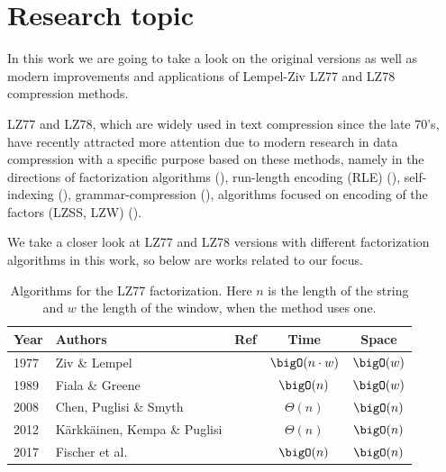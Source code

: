 \section{Research topic}
\label{seq:intro}

In this work we are going to take a look on the original versions as well as modern improvements and applications of Lempel-Ziv LZ77 and LZ78 compression methods.

LZ77 and LZ78, which are widely used in text compression since the late 70's, have recently attracted more attention due to modern research in data compression with a specific purpose based on these methods, namely in the directions of factorization algorithms (\cite{ziv1977, ziv1978,kkp2012,fischer2017,acm2012}), run-length encoding (RLE) (\cite{policriti2018}), self-indexing (\cite{kreft2011,gagie2014}), grammar-compression (\cite{rytter2003}), algorithms focused on encoding of the factors (LZSS, LZW) (\cite{storer1982,welch1984}).

We take a closer look at LZ77 and LZ78 versions with different factorization algorithms in this work, so below are works related to our focus.

\begin{table}[H]
    \centering
    \setlength{\tabcolsep}{11pt}
    \renewcommand{\arraystretch}{1.1}
    \begin{tabular}{llccc}
        \toprule
        Year & Authors & Ref & Time & Space \\
        \midrule
        1977 & Ziv \& Lempel                     & \cite{ziv1977}    & \(\bigO(n \cdot w)\) & \(\bigO(w)\) \\
        1989 & Fiala \& Greene                   & \cite{fiala1989}  & \(\bigO(n)\)   & \(\bigO(w)\) \\
        2008 & Chen, Puglisi \& Smyth            & \cite{chen2008}   & \(\Theta(n)\)  & \(\bigO(n)\) \\
        2012 & K\"arkk\"ainen, Kempa \& Puglisi  & \cite{kkp2012}    & \(\Theta(n)\)  & \(\bigO(n)\) \\
        2017 & Fischer et al.\                   & \cite{fischer2017}& \(\bigO(n)\)   & \(\bigO(n)\) \\
        \bottomrule
    \end{tabular}
    \caption{Algorithms for the LZ77 factorization. Here \(n\) is the length of the string and \(w\) the length of the window, when the method uses one.}
    \label{tab:related-work-lz77}
\end{table}

